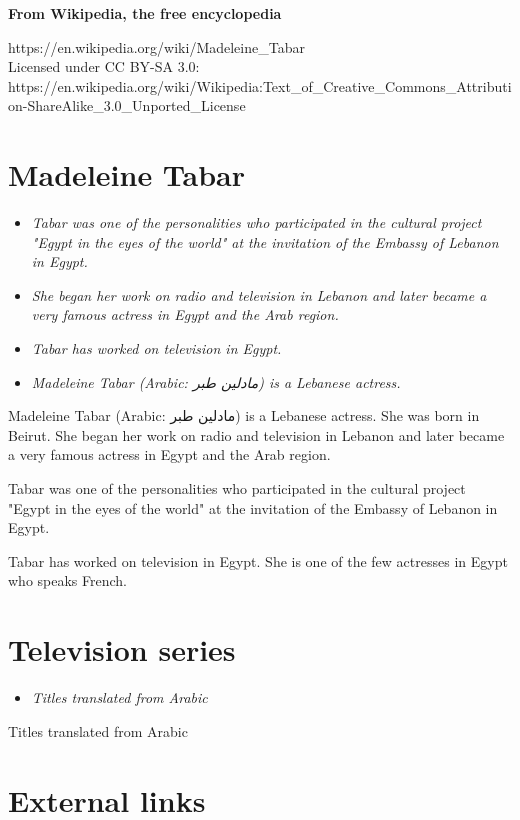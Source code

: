 \textbf{From Wikipedia, the free encyclopedia}

https://en.wikipedia.org/wiki/Madeleine\_Tabar\\
Licensed under CC BY-SA 3.0:\\
https://en.wikipedia.org/wiki/Wikipedia:Text\_of\_Creative\_Commons\_Attribution-ShareAlike\_3.0\_Unported\_License

\section{Madeleine Tabar}\label{madeleine-tabar}

\begin{itemize}
\item
  \emph{Tabar was one of the personalities who participated in the
  cultural project "Egypt in the eyes of the world" at the invitation of
  the Embassy of Lebanon in Egypt.}
\item
  \emph{She began her work on radio and television in Lebanon and later
  became a very famous actress in Egypt and the Arab region.}
\item
  \emph{Tabar has worked on television in Egypt.}
\item
  \emph{Madeleine Tabar (Arabic: مادلين طبر) is a Lebanese actress.}
\end{itemize}

Madeleine Tabar (Arabic: مادلين طبر) is a Lebanese actress. She was born
in Beirut. She began her work on radio and television in Lebanon and
later became a very famous actress in Egypt and the Arab region.

Tabar was one of the personalities who participated in the cultural
project "Egypt in the eyes of the world" at the invitation of the
Embassy of Lebanon in Egypt.

Tabar has worked on television in Egypt. She is one of the few actresses
in Egypt who speaks French.

\section{Television series}\label{television-series}

\begin{itemize}
\item
  \emph{Titles translated from Arabic}
\end{itemize}

Titles translated from Arabic

\section{External links}\label{external-links}

